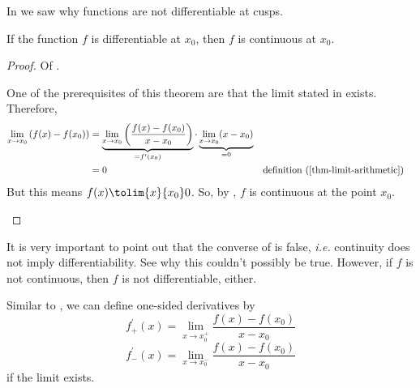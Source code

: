 \begin{rem}
	In  we saw why functions are not differentiable
	at cusps.
\end{rem}

\begin{thm}\label{thm-differentiability-implies-continuity}
	If the function $f$ is differentiable at $x_0$, then $f$ is continuous at $x_0$.
\end{thm}

\begin{proof}
	Of .
	\begin{flushleft}
		One of the prerequisites of this theorem are that the limit stated in
		 exists. Therefore,
		\begin{align*}
			\lim_{x \to x_0}\left(f(x)-f(x_0)\right) & = \underbrace{\lim_{x \to x_0}\left(\frac{f(x)-f(x_0)}{x-x_0}\right)}_{=f^\prime(x_0)}\cdot\underbrace{\lim_{x \to x_0}(x-x_0)}_{=0}                                                     \\
			                                         & =  0                                                                                                                                 &  & \text{\pref{definition}{thm-limit-arithmetic}} \\
		\end{align*}
		But this means $f(x)\tolim{x}{x_0}0$.
		So, by , $f$ is continuous at
		the point $x_0$.
	\end{flushleft}
\end{proof}

\begin{rem}\label{rem-continuity-doesnt-imply-differentiability}
	It is very important to point out that the converse of 
	is false, \textit{i.e.} continuity does not imply differentiability. See 
	why this couldn't possibly be true. However, if $f$ is not continuous, then $f$ is not differentiable, either.
\end{rem}

\begin{definition}\label{def-one-sided-derivatives}
	Similar to , we can define one-sided derivatives by
	\begin{equation}\label{eq-right-sided-derivative}
		f_+^\prime(x)=\lim_{x \to x_0^+}\frac{f(x)-f(x_0)}{x-x_0}
	\end{equation}
	\begin{equation}\label{eq-left-sided-derivative}
		f_-^\prime(x)=\lim_{x \to x_0^-}\frac{f(x)-f(x_0)}{x-x_0}
	\end{equation}
	if the limit exists.
\end{definition}

